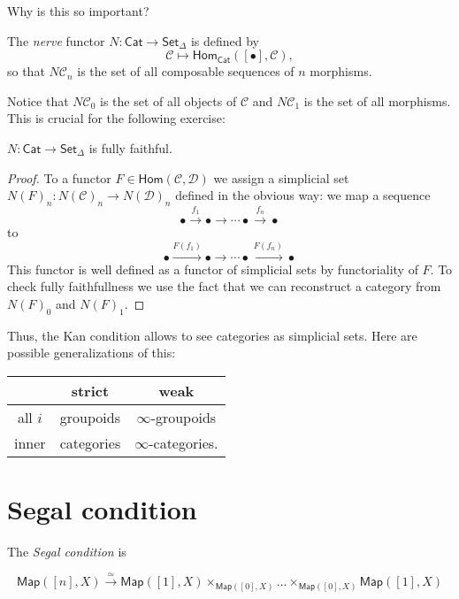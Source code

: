 Why is this so important?

\begin{definition}
\label{definition-nerve}
The {\it nerve} functor $N:\mathsf{Cat} \to \mathsf{Set}_\Delta$ 
is defined by
$$
\mathcal{C} \mapsto  \mathsf{Hom}_{\mathsf{Cat}}([\bullet],\mathcal{C}),
$$
so that $N\mathcal{C}_n$ is the set
of all composable sequences of $n$ morphisms.
\end{definition}

Notice that $N\mathcal{C}_0$ is the set of all objects of $\mathcal{C}$ 
and $N\mathcal{C}_1$ is the set of all morphisms.
This is crucial for the following exercise:

\begin{exercise}
\label{exercise-}
$N:\mathsf{Cat}\to\mathsf{Set}_\Delta$ is fully faithful.
\end{exercise}

\begin{proof}
To a functor $F \in \mathsf{Hom}(\mathcal{C},\mathcal{D})$ 
we assign a simplicial set $N(F)_n:N(\mathcal{C})_n \to N(\mathcal{D})_n$ 
defined in the obvious way: we map a sequence
$$
\bullet \xrightarrow{f_1}\bullet\to \cdots \bullet \xrightarrow{f_n}\bullet
$$
to
$$
\bullet \xrightarrow{F(f_1)}\bullet \to \cdots
\bullet\xrightarrow{F(f_n)}\bullet
$$
This functor is well defined as a functor
of simplicial sets by functoriality of $F$.
To check fully faithfullness we use the fact
that we can reconstruct a category from 
$N(F)_0$ and $N(F)_1$.
\end{proof}

Thus, the Kan condition allows to see categories
as simplicial sets. Here are possible generalizations
of this:

\begin{center}
\begin{tabular}{c | c | c}
& strict &weak\\
\hline
all $i$ & groupoids & $\infty$-groupoids\\
inner & categories & $\infty$-categories.
\end{tabular}
\end{center}

\section{Segal condition}
\label{section-segal-condition}

The {\it Segal condition} is

$$
\mathsf{Map}([n],X) \xrightarrow{\simeq}
\mathsf{Map}([1],X) \times_{\mathsf{Map}([0],X)}\ldots
\times_{\mathsf{Map}([0],X)}\mathsf{Map}([1],X)
$$

